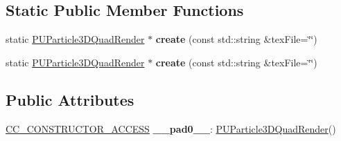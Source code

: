 \subsection*{Static Public Member Functions}
\begin{DoxyCompactItemize}
\item 
\mbox{\label{classPUParticle3DQuadRender_afad100c971047b92bf4374f8ecdc99e4}} 
static \hyperlink{classPUParticle3DQuadRender}{P\+U\+Particle3\+D\+Quad\+Render} $\ast$ {\bfseries create} (const std\+::string \&tex\+File=\char`\"{}\char`\"{})
\item 
\mbox{\label{classPUParticle3DQuadRender_a90d122f1576c08fde473998a38c6ce3d}} 
static \hyperlink{classPUParticle3DQuadRender}{P\+U\+Particle3\+D\+Quad\+Render} $\ast$ {\bfseries create} (const std\+::string \&tex\+File=\char`\"{}\char`\"{})
\end{DoxyCompactItemize}
\subsection*{Public Attributes}
\begin{DoxyCompactItemize}
\item 
\mbox{\label{classPUParticle3DQuadRender_a4b4deeced4752f4618b7567daa86e7ef}} 
\hyperlink{_2cocos2d_2cocos_2base_2ccConfig_8h_a25ef1314f97c35a2ed3d029b0ead6da0}{C\+C\+\_\+\+C\+O\+N\+S\+T\+R\+U\+C\+T\+O\+R\+\_\+\+A\+C\+C\+E\+SS} {\bfseries \+\_\+\+\_\+pad0\+\_\+\+\_\+}\+: \hyperlink{classPUParticle3DQuadRender}{P\+U\+Particle3\+D\+Quad\+Render}()
\end{DoxyCompactItemize}
